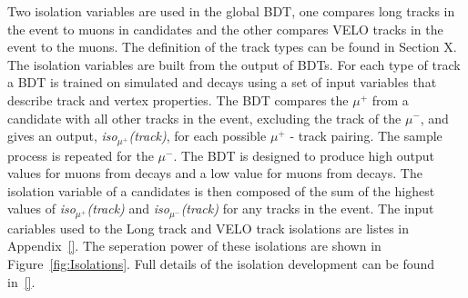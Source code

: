 Two isolation variables are used in the global BDT, one compares long tracks in the event to muons in \bsmumu candidates and the other compares VELO tracks in the event to the muons. The definition of the track types can be found in Section X. The isolation variables are built from the output of BDTs. For each type of track a BDT is trained on simulated \bsmumu and \bbbarmumux decays using a set of input variables that describe track and vertex properties. The BDT compares the $\mu^{+}$ from a \bsmumu candidate with all other tracks in the event, excluding the track of the $\mu^{-}$, and gives an output, {\it iso$_{\mu^{+}}$(track)}, for each possible $\mu^{+}$ - track pairing. The sample process is repeated for the $\mu^{-}$. The BDT is designed to produce high output values for muons from \bbbarmumux decays and a low value for muons from \bsmumu decays. The isolation variable of a \bsmumu candidates is then composed of the sum of the highest values of {\it iso$_{\mu^{+}}$(track)} and {\it iso$_{\mu^{-}}$(track)} for any tracks in the event. The input cariables used to the Long track and VELO track isolations are listes in Appendix~\ref{}. The seperation power of these isolations are shown in Figure~\ref{fig:Isolations}. Full details of the isolation development can be found in~\ref{}.

